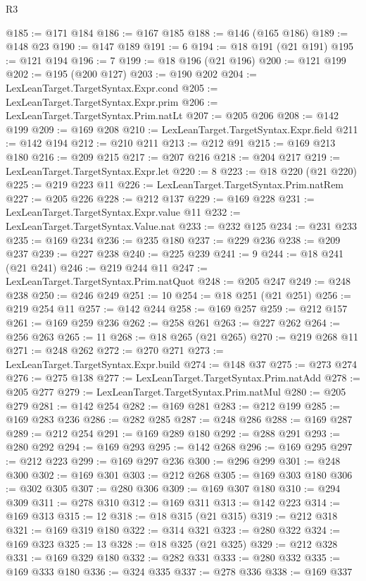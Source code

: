\begin{lexlean}{R3}
\begin{coremodule}
@185 := @171 @184
@186 := @167 @185
@188 := @146 (@165 @186)
@189 := @148 @23
@190 := @147 @189
@191 := 6
@194 := @18 @191 (@21 @191)
@195 := @121 @194
@196 := 7
@199 := @18 @196 (@21 @196)
@200 := @121 @199
@202 := @195 (@200 @127)
@203 := @190 @202
@204 := LexLeanTarget.TargetSyntax.Expr.cond
@205 := LexLeanTarget.TargetSyntax.Expr.prim
@206 := LexLeanTarget.TargetSyntax.Prim.natLt
@207 := @205 @206
@208 := @142 @199
@209 := @169 @208
@210 := LexLeanTarget.TargetSyntax.Expr.field
@211 := @142 @194
@212 := @210 @211
@213 := @212 @91
@215 := @169 @213 @180
@216 := @209 @215
@217 := @207 @216
@218 := @204 @217
@219 := LexLeanTarget.TargetSyntax.Expr.let
@220 := 8
@223 := @18 @220 (@21 @220)
@225 := @219 @223 @11
@226 := LexLeanTarget.TargetSyntax.Prim.natRem
@227 := @205 @226
@228 := @212 @137
@229 := @169 @228
@231 := LexLeanTarget.TargetSyntax.Expr.value @11
@232 := LexLeanTarget.TargetSyntax.Value.nat
@233 := @232 @125
@234 := @231 @233
@235 := @169 @234
@236 := @235 @180
@237 := @229 @236
@238 := @209 @237
@239 := @227 @238
@240 := @225 @239
@241 := 9
@244 := @18 @241 (@21 @241)
@246 := @219 @244 @11
@247 := LexLeanTarget.TargetSyntax.Prim.natQuot
@248 := @205 @247
@249 := @248 @238
@250 := @246 @249
@251 := 10
@254 := @18 @251 (@21 @251)
@256 := @219 @254 @11
@257 := @142 @244
@258 := @169 @257
@259 := @212 @157
@261 := @169 @259 @236
@262 := @258 @261
@263 := @227 @262
@264 := @256 @263
@265 := 11
@268 := @18 @265 (@21 @265)
@270 := @219 @268 @11
@271 := @248 @262
@272 := @270 @271
@273 := LexLeanTarget.TargetSyntax.Expr.build
@274 := @148 @37
@275 := @273 @274
@276 := @275 @138
@277 := LexLeanTarget.TargetSyntax.Prim.natAdd
@278 := @205 @277
@279 := LexLeanTarget.TargetSyntax.Prim.natMul
@280 := @205 @279
@281 := @142 @254
@282 := @169 @281
@283 := @212 @199
@285 := @169 @283 @236
@286 := @282 @285
@287 := @248 @286
@288 := @169 @287
@289 := @212 @254
@291 := @169 @289 @180
@292 := @288 @291
@293 := @280 @292
@294 := @169 @293
@295 := @142 @268
@296 := @169 @295
@297 := @212 @223
@299 := @169 @297 @236
@300 := @296 @299
@301 := @248 @300
@302 := @169 @301
@303 := @212 @268
@305 := @169 @303 @180
@306 := @302 @305
@307 := @280 @306
@309 := @169 @307 @180
@310 := @294 @309
@311 := @278 @310
@312 := @169 @311
@313 := @142 @223
@314 := @169 @313
@315 := 12
@318 := @18 @315 (@21 @315)
@319 := @212 @318
@321 := @169 @319 @180
@322 := @314 @321
@323 := @280 @322
@324 := @169 @323
@325 := 13
@328 := @18 @325 (@21 @325)
@329 := @212 @328
@331 := @169 @329 @180
@332 := @282 @331
@333 := @280 @332
@335 := @169 @333 @180
@336 := @324 @335
@337 := @278 @336
@338 := @169 @337

\end{coremodule}
\end{lexlean}
